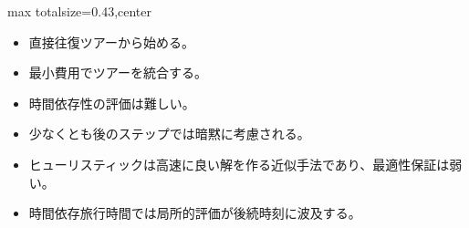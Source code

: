 \clearpage
{}
\begin{minipage}[t]{0.405\textwidth}
\begin{adjustbox}{max totalsize={\textwidth}{0.43\textheight},center}
\begin{minipage}{\textwidth}\scriptsize
{}\begin{itemize}
\item 直接往復ツアーから始める。
\item 最小費用でツアーを統合する。
\item 時間依存性の評価は難しい。
\item 少なくとも後のステップでは暗黙に考慮される。
\end{itemize}\begin{itemize}
\item ヒューリスティックは高速に良い解を作る近似手法であり、最適性保証は弱い。
\item 時間依存旅行時間では局所的評価が後続時刻に波及する。
\end{itemize}
\end{minipage}
\end{adjustbox}
\end{minipage}\hfill
